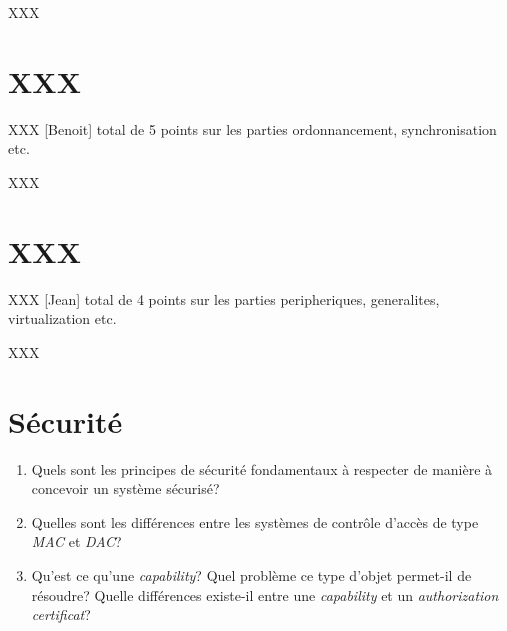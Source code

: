 \begin{correction}

XXX

\end{correction}

%
%

\section{XXX
         {\hfill{} }}

XXX [Benoit] total de 5 points sur les parties ordonnancement, synchronisation
             etc.

\begin{correction}

XXX

\end{correction}

%
%

\section{XXX
         }

XXX [Jean] total de 4 points sur les parties peripheriques, generalites,
           virtualization etc.

\begin{correction}

XXX

\end{correction}

% 
%

\section{S\'ecurit\'e
         }

\begin{enumerate}
  \item
    Quels sont les principes de s\'ecurit\'e fondamentaux \`a respecter
    de mani\`ere \`a concevoir un syst\`eme s\'ecuris\'e?
  \item
    Quelles sont les diff\'erences entre les syst\`emes de contr\^ole d'acc\`es
    de type \textit{MAC} et \textit{DAC}?
  \item
    Qu'est ce qu'une \textit{capability}? Quel probl\`eme ce type d'objet
    permet-il de r\'esoudre? Quelle diff\'erences existe-il entre une
    \textit{capability} et un \textit{authorization certificat}?
\end{enumerate}

